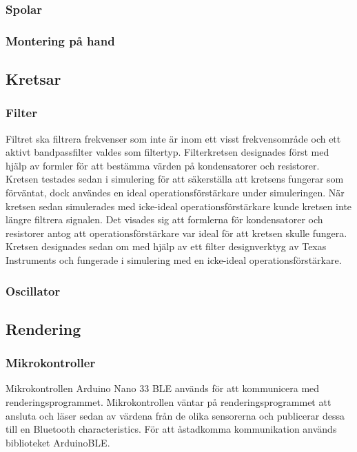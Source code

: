 \documentclass[a4paper]{article}
\begin{document}
\begin{sloppypar}
    \subsubsection{Spolar}
    \subsubsection{Montering på hand} %

    \subsection{Kretsar}
    \subsubsection{Filter}
    Filtret ska filtrera frekvenser som inte är inom ett visst frekvensområde och ett aktivt bandpassfilter valdes som filtertyp.
    Filterkretsen designades först med hjälp av formler för att bestämma värden på kondensatorer och resistorer.
    Kretsen testades sedan i simulering för att säkerställa att kretsens fungerar som förväntat,
    dock användes en ideal operationsförstärkare under simuleringen.
    När kretsen sedan simulerades med icke-ideal operationsförstärkare kunde kretsen inte längre filtrera signalen.
    Det visades sig att formlerna för kondensatorer och resistorer
    antog att operationsförstärkare var ideal för att kretsen skulle fungera.
    Kretsen designades sedan om med hjälp av ett filter designverktyg av Texas Instruments
    och fungerade i simulering med en icke-ideal operationsförstärkare.
    \subsubsection{Oscillator}


    \subsection{Rendering}
    \subsubsection{Mikrokontroller}
    Mikrokontrollen Arduino Nano 33 BLE används för att kommunicera med renderingsprogrammet.
    Mikrokontrollen väntar på renderingsprogrammet att ansluta och
    läser sedan av värdena från de olika sensorerna och publicerar dessa till en Bluetooth characteristics.
    För att åstadkomma kommunikation används biblioteket ArduinoBLE.


\end{sloppypar}
\end{document}
